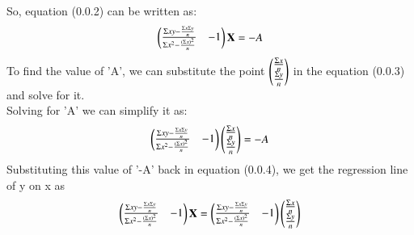 \documentclass[journal,12pt,twocolumn]{IEEEtran}
\begin{document}
So, equation (0.0.2) can be written as:\\
\begin{align}
    \begin{pmatrix}\frac{\Sigma xy - \frac{\Sigma x \Sigma y}{n}}{\Sigma x^2 - \frac{(\Sigma x)^2}{n}} & -1\end{pmatrix}\mathbf{X} = -A
\end{align}
To find the value of 'A', we can substitute the point $ \begin{pmatrix}\frac{\Sigma x}{n} \\ \frac{\Sigma y}{n}\end{pmatrix}  $ in the equation (0.0.3) and solve for it.\\
Solving for 'A' we can simplify it as:\\
\begin{align}
    \begin{pmatrix}\frac{\Sigma xy - \frac{\Sigma x \Sigma y}{n}}{\Sigma x^2 - \frac{(\Sigma x)^2}{n}} & -1\end{pmatrix}\begin{pmatrix}\frac{\Sigma x}{n} \\ \frac{\Sigma y}{n}\end{pmatrix} = -A
\end{align}
Substituting this value of '-A' back in equation (0.0.4), we get the regression line of y on x as\\
\begin{align}
    \begin{pmatrix}\frac{\Sigma xy - \frac{\Sigma x \Sigma y}{n}}{\Sigma x^2 - \frac{(\Sigma x)^2}{n}} & -1\end{pmatrix}\mathbf{X} = \begin{pmatrix}\frac{\Sigma xy - \frac{\Sigma x \Sigma y}{n}}{\Sigma x^2 - \frac{(\Sigma x)^2}{n}} & -1\end{pmatrix}\begin{pmatrix}\frac{\Sigma x}{n} \\ \frac{\Sigma y}{n}\end{pmatrix}
\end{align}\\
\end{document}

